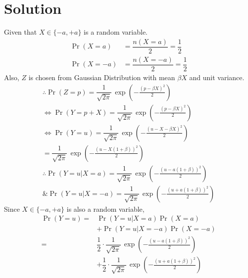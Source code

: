 \documentclass[journal,10pt,twocolumn]{IEEEtran}
\begin{document}
\section{Solution}
Given that $X \in \{ -a, +a\}$ is a random variable.
\begin{align}
\Pr(X=a) &= \dfrac{n(X=a)}{2} = \dfrac{1}{2}\\
\Pr(X=-a) &= \dfrac{n(X=-a)}{2} = \dfrac{1}{2}
\end{align}
Also, $Z$ is chosen from Gaussian Distribution with mean $\beta X$ and unit variance.
\begin{align}
\therefore \Pr(Z=p) = \dfrac{1}{\sqrt{2\pi}}\,\exp \left(-\frac{(p - \beta X)^2}{2} \right)  \\
\Leftrightarrow \Pr(Y = p + X) = \dfrac{1}{\sqrt{2\pi}}\,\exp \left(-\frac{(p - \beta X)^2}{2} \right)  \\
\Leftrightarrow \Pr(Y = u) = \dfrac{1}{\sqrt{2\pi}}\,\exp \left(-\frac{(u - X - \beta X)^2}{2} \right)  \\
= \dfrac{1}{\sqrt{2\pi}}\,\exp \left(-\frac{(u - X(1 + \beta))^2}{2} \right) \\
\therefore \Pr(Y = u | X = a) = \dfrac{1}{\sqrt{2\pi}}\,\exp \left(-\frac{(u - a(1 + \beta))^2}{2} \right) \label{eqn 2.0.7} \\
\& \Pr(Y = u | X = -a) = \dfrac{1}{\sqrt{2\pi}}\,\exp \left(-\frac{(u + a(1 + \beta))^2}{2} \right) \label{eqn 2.0.8}
\end{align}
Since $X \in \{ -a, +a\}$ is also a random variable,
\begin{align}
\Pr(Y = u) = &\Pr(Y=u | X = a)\Pr(X=a) \nonumber \\
               & + \Pr(Y=u | X = -a)\Pr(X=-a)\\
 = &\dfrac{1}{2} \cdot \dfrac{1}{\sqrt{2\pi}}\,\exp \left(-\frac{(u - a(1 + \beta))^2}{2} \right) \nonumber \\
      &+ \dfrac{1}{2} \cdot \dfrac{1}{\sqrt{2\pi}}\,\exp \left(-\frac{(u + a(1 + \beta))^2}{2} \right)
\end{align}
\end{document}
